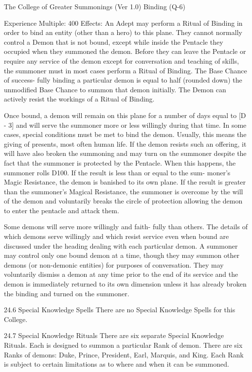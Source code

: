 \begin{Chapter}{The College of Greater Summonings (Ver 1.0)}
Binding (Q-6) 

Experience Multiple: 400 
Effects: An Adept may perform a Ritual of Binding 
in order to bind an entity (other than a hero) to this 
plane. They cannot normally control a Demon that 
is not bound, except while inside the Pentacle they 
occupied when they summoned the demon. Before 
they  can  leave  the  Pentacle  or  require  any  service 
of the demon except for conversation and teaching 
of skills, the summoner must in most cases perform 
a  Ritual  of  Binding.  The  Base  Chance  of  success-
fully  binding  a  particular  demon  is  equal  to  half 
(rounded  down)  the  unmodified  Base  Chance  to 
summon  that  demon  initially.  The  Demon  can 
actively resist the workings of a Ritual of Binding. 

Once bound, a demon will remain on this plane for 
a number of days equal to [D - 3] and will serve the 
summoner more or  less willingly during that time. 
In  some  cases,  special  conditions  must  be  met  to 
bind  the  demon.  Usually,  this  means  the  giving  of 
presents,  most  often  human  life.  If  the  demon 
resists such an offering, it will have also broken the 
summoning and may turn on the summoner despite 
the  fact  that  the  summoner  is  protected  by  the 
Pentacle.  When  this  happens,  the  summoner  rolls 
D100. If the result is less than or equal to the sum-
moner’s  Magic  Resistance,  the  demon  is  banished 
to  its  own  plane.  If  the  result  is  greater  than  the 
summoner’s  Magical  Resistance,  the  summoner  is 
overcome by the will of the demon and voluntarily 
breaks the circle of protection allowing the demon 
to enter the pentacle and attack them. 

Some demons  will serve more  willingly and faith-
fully  than  others.  The  details  of  which  demons 
serve willingly and which resist service even when 
bound  are  discussed  under  the  heading  dealing 
with  each  particular  demon.  A  summoner  may 
control  only  one  bound  demon  at  a  time,  though 
they  may  summon  other  demons  (or  non-demonic 
entities)  for  purposes  of  conversation.  They  may 
voluntarily  dismiss  a  demon  at  any  time  prior  to 
the end of its service and the demon is immediately 
returned to its own dimension unless it has already 
broken the binding and turned on the summoner. 

24.6 Special Knowledge Spells 
There  are  no  Special  Knowledge  Spells  for  this 
College. 

24.7 Special Knowledge Rituals 
There  are  six  separate  Special  Knowledge  Rituals. 
Each  is  designed  to  summon  a  particular  Rank  of 
demon.  There  are  six  Ranks  of  demons:  Duke, 
Prince,  President,  Earl,  Marquis,  and  King.  Each 
Rank  is  subject  to  certain  limitations  as  to  where 
and when it can be summoned. 


\end{Chapter}
